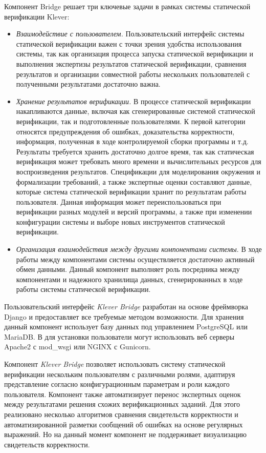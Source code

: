 \documentclass[%
candidate,     %
href,        %
colorlinks,  %
]{disser}
\begin{document}

Компонент Bridge решает три ключевые задачи в рамках системы статической верификации Klever:
\begin{itemize}
\item \textit{Взаимодействие с пользователем.}
Пользовательский интерфейс системы статической верификации важен с точки зрения удобства использования системы, так как организация процесса запуска статической верификации и выполнения экспертизы результатов статической верификации, сравнения результатов и организации совместной работы нескольких пользователей с полученными результатами достаточно важна.  
\item \textit{Хранение результатов верификации.} 
В процессе статической верификации накапливаются данные, включая как сгенерированные системой статической верификации, так и подготовленные пользователями. 
К первой категории относятся предупреждения об ошибках, доказательства корректности, информация, полученная в ходе контролируемой сборки программы и т.д.
Результаты требуется хранить достаточно долгое время, так как статическая верификация может требовать много времени и вычислительных ресурсов для воспроизведения результатов. 
Спецификации для моделирования окружения и формализации требований, а также экспертные оценки составляют данные, которые система статической верификации хранит по результатам работы пользователя.
Данная информация может переиспользоваться при верификации разных модулей и версий программы, а также при изменении конфигурации системы и выборе новых инструментов статической верификации. 
\item \textit{Организация взаимодействия между другими компонентами системы}.
В ходе работы между компонентами системы осуществляется достаточно активный обмен данными.
Данный компонент выполняет роль посредника между компонентами и надежного хранилища данных, сгенерированных в ходе работы системы статической верификации.
\end{itemize}

Пользовательский интерфейс \textit{Klever Bridge} разработан на основе фреймворка Django и предоставляет все требуемые методом возможности.
Для хранения данный компонент использует базу данных под управлением PostgreSQL или MariaDB.
В для установки пользователи могут использовать веб серверы Apache2 с mod\_wsgi или NGINX с Gunicorn.

Компонент \textit{Klever Bridge} позволяет использовать систему статической верификации нескольким пользователям с различными ролями, адаптируя представление согласно конфигурационным параметрам и роли каждого пользователя.
Компонент также автоматизирует перенос экспертных оценок между результатами решения схожих верификационных заданий.
Для этого реализовано несколько алгоритмов сравнения свидетельств корректности и автоматизированной разметки сообщений об ошибках на основе регулярных выражений.
Но на данный момент компонент не поддерживает визуализацию свидетельств корректности. 
\end{document}
